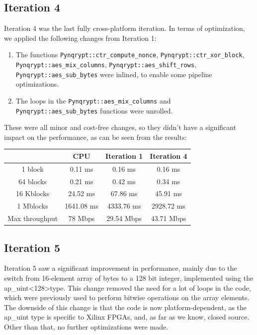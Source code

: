 \documentclass[12pt,oneside,a4paper]{article}
\begin{document}
\subsection{Iteration 4} \label{subsec:iter4}
Iteration 4 was the last fully cross-platform iteration.
In terms of optimization, we applied the following changes from Iteration 1:
\begin{enumerate}
	\item The functions {\tt Pynqrypt::ctr\_compute\_nonce}, {\tt Pynqrypt::ctr\_xor\_block}, {\tt Pynqrypt::aes\_mix\_columns}, {\tt Pynqrypt::aes\_shift\_rows}, \\ {\tt Pynqrypt::aes\_sub\_bytes} were inlined, to enable some pipeline optimizations.
	\item The loops in the {\tt Pynqrypt::aes\_mix\_columns} and {\tt Pynqrypt::aes\_sub\_bytes} functions were unrolled.
\end{enumerate}

These were all minor and cost-free changes, so they didn't have a significant impact on the performance, as can be seen from the results:
\begin{table}[h!]
	\centering
	\begin{tabular}{cccc}
		\toprule
		 & CPU & Iteration 1 & Iteration 4 \\
		\midrule
		1 block & 0.11 ms & 0.16 ms & 0.16 ms \\
		64 blocks & 0.21 ms & 0.42 ms & 0.34 ms \\
		16 Kblocks & 24.52 ms & 67.86 ms & 45.91 ms \\
		1 Mblocks & 1641.08 ms & 4333.76 ms & 2928.72 ms \\
		Max throughput & 78 Mbps & 29.54 Mbps & 43.71 Mbps \\
		\bottomrule
	\end{tabular}
\end{table}

\subsection{Iteration 5} \label{subsec:iter5}
Iteration 5 saw a significant improvement in performance, mainly due to the switch from 16-element array of bytes to a 128 bit integer, implemented using the ap\_uint\textless128\textgreater type.
This change removed the need for a lot of loops in the code, which were previously used to perform bitwise operations on the array elements.
The downside of this change is that the code is now platform-dependent, as the ap\_uint type is specific to Xilinx FPGAs, and, as far as we know, closed source. Other than that, no further optimizations were made.
\end{document}
